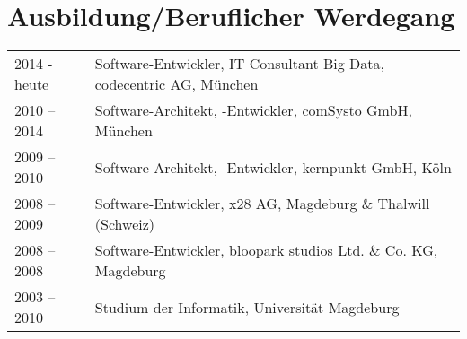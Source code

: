 \section*{Ausbildung/Beruflicher Werdegang}
\begin{longtable}{@{}p{6cm}p{10cm}}
2014 - heute	& Software-Entwickler, IT Consultant Big Data, codecentric AG, München\\
2010 – 2014  	& Software-Architekt, -Entwickler, comSysto GmbH, München\\
2009 – 2010  	& Software-Architekt, -Entwickler, kernpunkt GmbH, Köln\\
2008 – 2009 	& Software-Entwickler, x28 AG, Magdeburg \&  Thalwill (Schweiz)\\
2008 – 2008 	& Software-Entwickler, bloopark studios Ltd. \& Co. KG, Magdeburg\\
2003 – 2010 	& Studium der Informatik, Universität Magdeburg
\end{longtable}

